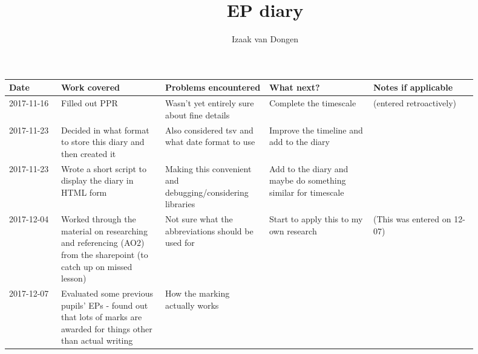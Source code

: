 \documentclass{article}
\title{EP diary}
\author{Izaak van Dongen}
\begin{document}
    \maketitle

    \begin{center}
    {
    \renewcommand{\arraystretch}{2.0}
    \begin{longtable}{p{0.1\linewidth} p{0.2\linewidth} p{0.2\linewidth} p{0.2\linewidth} p{0.2\linewidth}} \toprule

    Date & Work covered & Problems encountered & What next? & Notes if applicable \\ \midrule

    2017-11-16 &

    Filled out PPR &

    Wasn't yet entirely sure about fine details &

    Complete the timescale &

    (entered retroactively) \\ 2017-11-23 &

    Decided in what format to store this diary and then created it &

    Also considered tsv and what date format to use &

    Improve the timeline and add to the diary &

    \\ 2017-11-23 &

    Wrote a short script to display the diary in HTML form &

    Making this convenient and debugging/considering libraries &

    Add to the diary and maybe do something similar for timescale &

    \\ 2017-12-04 &

    Worked through the material on researching and referencing (AO2) from the
    sharepoint (to catch up on missed lesson) &

    Not sure what the abbreviations should be used for &

    Start to apply this to my own research &

    (This was entered on 12-07) \\ 2017-12-07 &

    Evaluated some previous pupils' EPs - found out that lots of marks are
    awarded for things other than actual writing &

    How the marking actually works &


\end{longtable}}
\end{center}
\end{document}

